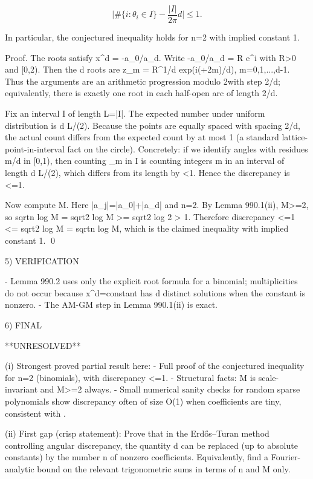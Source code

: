 \[
  \Big| \#\{i: \theta_i \in I\} - \frac{|I|}{2\pi} d \Big| \le 1.
\]

In particular, the conjectured inequality holds for n=2 with implied constant 1.

Proof.
The roots satisfy x^d = -a_0/a_d. Write -a_0/a_d = R e^{i\phi} with R>0 and \phi\in[0,2\pi).
Then the d roots are
  z_m = R^{1/d} exp(i(\phi+2\pi m)/d),  m=0,1,...,d-1.
Thus the arguments are an arithmetic progression modulo 2\pi with step 2\pi/d; equivalently,
there is exactly one root in each half-open arc of length 2\pi/d.

Fix an interval I of length L=|I|. The expected number under uniform distribution is d L/(2\pi).
Because the points are equally spaced with spacing 2\pi/d, the actual count differs from the
expected count by at most 1 (a standard lattice-point-in-interval fact on the circle).
Concretely: if we identify angles with residues m/d in [0,1), then counting \theta_m in I is
counting integers m in an interval of length d L/(2\pi), which differs from its length by <1.
Hence the discrepancy is <=1.

Now compute M. Here \sum |a_j|=|a_0|+|a_d| and n=2. By Lemma 990.1(ii), M>=2, so
sqrt{n log M} = sqrt{2 log M} >= sqrt{2 log 2} > 1.
Therefore
  discrepancy <=1 <= sqrt{2 log M} = sqrt{n log M},
which is the claimed inequality with implied constant 1.
\qed

5) VERIFICATION

- Lemma 990.2 uses only the explicit root formula for a binomial; multiplicities do not occur
  because x^d=constant has d distinct solutions when the constant is nonzero.
- The AM-GM step in Lemma 990.1(ii) is exact.

6) FINAL

**UNRESOLVED**

(i) Strongest proved partial result here:
    - Full proof of the conjectured inequality for n=2 (binomials), with discrepancy <=1.
    - Structural facts: M is scale-invariant and M>=2 always.
    - Small numerical sanity checks for random sparse polynomials show discrepancy often of
      size O(1) when coefficients are tiny, consistent with .

(ii) First gap (crisp statement):
    Prove that in the Erd\H{o}s--Turan method controlling angular discrepancy, the quantity d
    can be replaced (up to absolute constants) by the number n of nonzero coefficients.
    Equivalently, find a Fourier-analytic bound on the relevant trigonometric sums in terms
    of n and M only.

